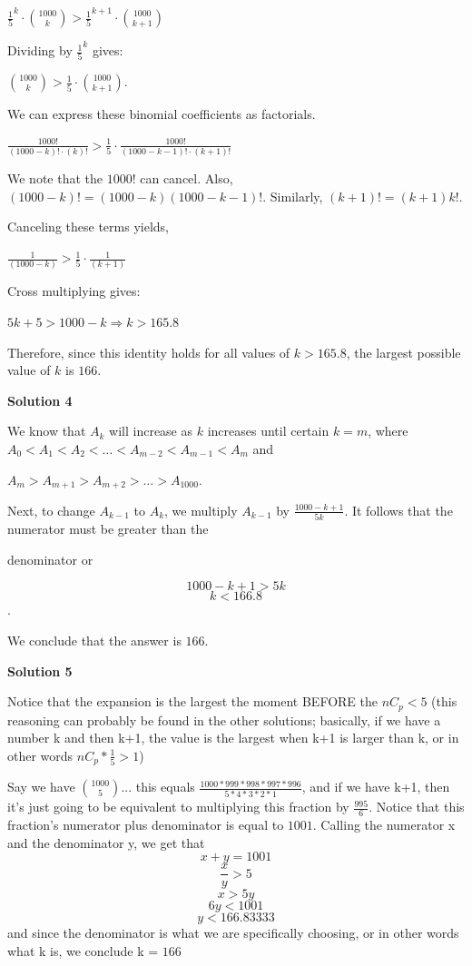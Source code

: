 \begin{enumerate}
 ${\frac{1}{5}}^k\cdot {{1000} \choose {k}}>{\frac{1}{5}}^{k+1}\cdot {{1000} \choose {k+1}}$

 Dividing by ${\frac{1}{5}}^k$ gives:

 ${1000\choose k}>{\frac{1}{5}}\cdot{1000\choose {k+1}}$.

 We can express these binomial coefficients as factorials.

 $\frac{1000!}{(1000-k)!\cdot(k)!}>{\frac{1}{5}}\cdot\frac{1000!}{(1000-k-1)!\cdot{(k+1)!}}$

 We note that the $1000!$ can cancel. Also, $(1000-k)!=(1000-k)(1000-k-1)!$. Similarly, $(k+1)!=(k+1)k!$.

 Canceling these terms yields,

 $\frac{1}{(1000-k)}>{\frac{1}{5}}\cdot\frac{1}{(k+1)}$

 Cross multiplying gives:

 $5k+5>1000-k \Rightarrow k>165.8$

 Therefore, since this identity holds for all values of $k>165.8$, the largest possible value of $k$ is $\boxed{166}$.

 



\textbf{Solution 4}

We know that $A_k$ will increase as $k$ increases until certain $k=m$, where $A_0 < A_1 < A_2 < \dots < A_{m-2} < A_{m-1} < A_m$ and  

 $A_m > A_{m+1} > A_{m+2} > \dots > A_{1000}.$

 Next, to change $A_{k-1}$ to $A_k$, we multiply $A_{k-1}$ by $\frac{1000-k+1}{5k}$. It follows that the numerator must be greater than the

 denominator or

 
 \[1000-k+1>5k\] 
 \[k<166.8\].

 We conclude that the answer is $\boxed{166}$.

 



\textbf{Solution 5}

Notice that the expansion is the largest the moment BEFORE the $nC_p < 5$ (this reasoning can probably be found in the other solutions; basically, if we have a number k and then k+1, the value is the largest when k+1 is larger than k, or in other words $nC_p*\frac{1}{5} > 1$)

 Say we have ${1000 \choose 5}$... this equals $\frac{1000*999*998*997*996}{5*4*3*2*1}$, and if we have k+1, then it's just going to be equivalent to multiplying this fraction by $\frac{995}{6}$. Notice that this fraction's numerator plus denominator is equal to $1001$. Calling the numerator x and the denominator y, we get that
 \[x+y = 1001\] 
 \[\frac{x}{y} > 5\] 
 \[x>5y\] 
 \[6y<1001\] 
 \[y<166.83333\] and since the denominator is what we are specifically choosing, or in other words what k is, we conclude k = $\boxed{166}$


\end{enumerate}

